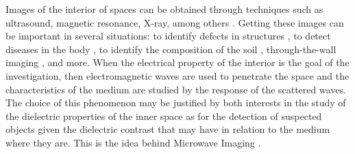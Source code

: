 	Images of the interior of spaces can be obtained through techniques such as ultrasound, magnetic resonance, X-ray, among others \citep{morris2012diagnostic}. Getting these images can be important in several situations: to identify defects in structures \citep{benedetti2007multicrack,bozza2008linear,caorsi2004improved}, to detect diseases in the body \citep{fhager2018microwave,nikolova2011microwave}, to identify the composition of the soil \citep{zhang2010microwave,randazzo2021assessment}, through-the-wall imaging \citep{fedeli2017preliminary,dougu2020truncated}, and more. When the electrical property of the interior is the goal of the investigation, then electromagnetic waves are used to penetrate the space and the characteristics of the medium are studied by the response of the scattered waves. The choice of this phenomenon may be justified by both interests in the study of the dielectric properties of the inner space as for the detection of suspected objects given the dielectric contrast that may have in relation to the medium where they are. This is the idea behind Microwave Imaging \citep{pastorino2000microwave}.
	
